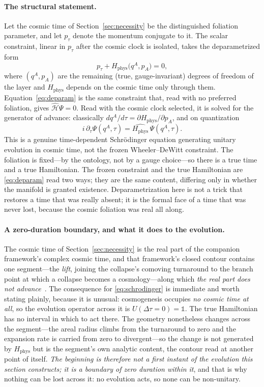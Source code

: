 \documentclass[11pt,a4paper]{article}
\theoremstyle{plain}
\theoremstyle{definition}
\theoremstyle{remark}
\newcommand{\Hphys}{H_{\mathrm{phys}}}
\begin{document}
\paragraph{The structural statement.}
Let the cosmic time of Section~\ref{sec:necessity} be the distinguished foliation parameter, and let $p_\tau$ denote the momentum conjugate to it. The scalar constraint, linear in $p_\tau$ after the cosmic clock is isolated, takes the deparametrized form
\begin{equation}
p_\tau + \Hphys\big(q^A, p_A\big) = 0,
\label{eq:deparam}
\end{equation}
where $(q^A,p_A)$ are the remaining (true, gauge-invariant) degrees of freedom of the layer and $\Hphys$ depends on the cosmic time only through them. Equation~\eqref{eq:deparam} is the same constraint that, read with no preferred foliation, gives $\hat{\mathcal{H}}\Psi=0$. Read with the cosmic clock selected, it is solved for the generator of advance: classically $dq^A/d\tau = \partial \Hphys/\partial p_A$, and on quantization
\begin{equation}
i\,\partial_\tau \Psi(q^A,\tau) = \hat{\Hphys}\,\Psi(q^A,\tau).
\label{eq:schrodinger}
\end{equation}
This is a genuine time-dependent Schr\"odinger equation generating unitary evolution in cosmic time, not the frozen Wheeler--DeWitt constraint. The foliation is fixed---by the ontology, not by a gauge choice---so there is a true time and a true Hamiltonian. The frozen constraint and the true Hamiltonian are \eqref{eq:deparam} read two ways; they are the same content, differing only in whether the manifold is granted existence. Deparametrization here is not a trick that restores a time that was really absent; it is the formal face of a time that was never lost, because the cosmic foliation was real all along.

\paragraph{A zero-duration boundary, and what it does to the evolution.} The cosmic time of
Section~\ref{sec:necessity} is the real part of the companion framework's complex cosmic time, and that
framework's closed contour contains one segment---the \emph{lift}, joining the collapse's comoving turnaround
to the branch point at which a collapse becomes a cosmology---along which \emph{the real part does not
advance}~\cite{JanzenCRframework}. The consequence for \eqref{eq:schrodinger} is immediate and worth stating
plainly, because it is unusual: cosmogenesis occupies \emph{no cosmic time at all}, so the evolution operator
across it is $U(\Delta\tau=0)=\mathbb{1}$. The true Hamiltonian has no interval in which to act there. The
geometry nonetheless changes across the segment---the areal radius climbs from the turnaround to zero and the
expansion rate is carried from zero to divergent---so the change is not generated by $\Hphys$ but is the
segment's own analytic content, the contour read at another point of itself. \emph{The beginning is therefore
not a first instant of the evolution this section constructs; it is a boundary of zero duration within it}, and
that is why nothing can be lost across it: no evolution acts, so none can be non-unitary.
\end{document}
